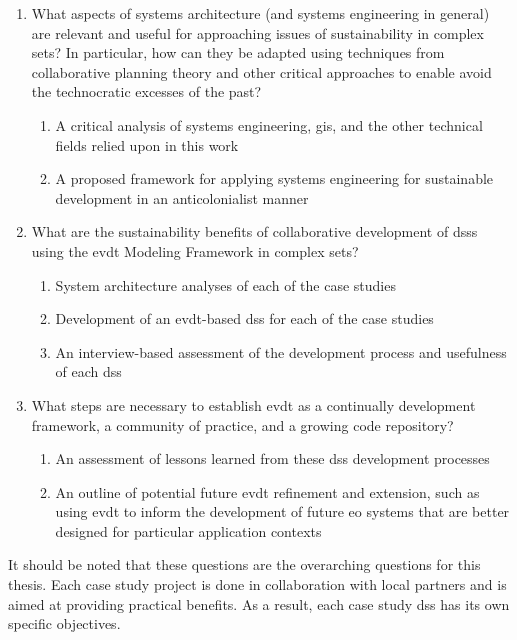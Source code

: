 \documentclass[notitlepage]{article}
\begin{document}
\begin{enumerate}[itemsep=0pt,parsep=0pt]
	\item{What aspects of systems architecture (and systems engineering in general) are relevant and useful for approaching issues of sustainability in complex \ac{sets}? In particular, how can they be adapted using techniques from collaborative planning theory and other critical approaches to enable avoid the technocratic excesses of the past?}
	\begin{enumerate}[label=\emph{\alph*}),itemsep=0pt,parsep=0pt]
		\item{A critical analysis of systems engineering, \ac{gis}, and the other technical fields relied upon in this work}
		\item{A proposed framework for applying systems engineering for sustainable development in an anticolonialist manner}
	\end{enumerate}
	\item{\color{OliveGreen} What are the sustainability benefits of collaborative development of \acp{dss} using the \ac{evdt} Modeling Framework in complex \ac{sets}? \color{black}}
	\begin{enumerate}[label=\emph{\alph*}),itemsep=0pt,parsep=0pt]
		\item{System architecture analyses of each of the case studies}
		\item{Development of an \ac{evdt}-based \ac{dss} for each of the case studies}
		\item{An interview-based assessment of the development process and usefulness of each \ac{dss}}
	\end{enumerate}
	\item{\color{OliveGreen} What steps are necessary to establish \ac{evdt} as a continually development framework, a community of practice, and a growing code repository? \color{black}}
	\begin{enumerate}[label=\emph{\alph*}),itemsep=0pt,parsep=0pt]
		\item{An assessment of lessons learned from these \ac{dss} development processes}
		\item{An outline of potential future \ac{evdt} refinement and extension, such as using \ac{evdt} to inform the development of future \ac{eo} systems that are better designed for particular application contexts}
	\end{enumerate}
\end{enumerate}

It should be noted that these questions are the overarching questions for this thesis. Each case study project is done in collaboration with local partners and is aimed at providing practical benefits. As a result, each case study \ac{dss} has its own specific objectives.
\end{document}
